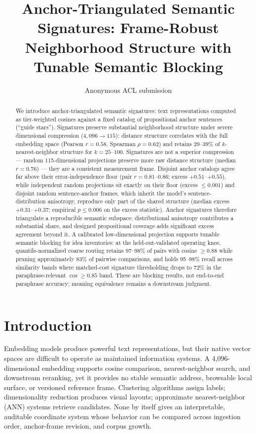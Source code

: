 \documentclass[11pt]{article}
\title{Anchor-Triangulated Semantic Signatures: Frame-Robust Neighborhood Structure with Tunable Semantic Blocking}
\author{Anonymous ACL submission}
\begin{document}
\maketitle

\begin{abstract}
We introduce anchor-triangulated semantic signatures: text representations computed as tier-weighted cosines against a fixed catalog of propositional anchor sentences (``guide stars''). Signatures preserve substantial neighborhood structure under severe dimensional compression ($4{,}096\rightarrow115$): distance structure correlates with the full embedding space (Pearson $r=0.58$, Spearman $\rho=0.62$) and retains 29--39\% of $k$-nearest-neighbor structure for $k=25$--100. Signatures are not a superior compression --- random 115-dimensional projections preserve more raw distance structure (median $r=0.76$) --- they are a consistent measurement frame. Disjoint anchor catalogs agree far above their error-independence floor (pair $r=0.81$--$0.86$; excess $+0.51$--$+0.55$), while independent random projections sit exactly on their floor (excess $\leq0.001$) and disjoint random sentence-anchor frames, which inherit the model's sentence-distribution anisotropy, reproduce only part of the shared structure (median excess $+0.31$--$+0.37$; empirical $p\leq0.006$ on the excess statistic). Anchor signatures therefore triangulate a reproducible semantic subspace: distributional anisotropy contributes a substantial share, and designed propositional coverage adds significant excess agreement beyond it. A calibrated low-dimensional projection supports tunable semantic blocking for idea inventories: at the held-out-validated operating knee, quantile-normalized coarse routing retains 97--98\% of pairs with cosine $\geq0.88$ while pruning approximately 83\% of pairwise comparisons, and holds 95--98\% recall across similarity bands where matched-cost signature thresholding drops to 72\% in the paraphrase-relevant $\cos\geq0.85$ band. These are blocking results, not end-to-end paraphrase accuracy; meaning equivalence remains a downstream judgment.
\end{abstract}

\section{Introduction}

Embedding models produce powerful text representations, but their native vector spaces are difficult to operate as maintained information systems. A 4,096-dimensional embedding supports cosine comparison, nearest-neighbor search, and downstream reranking, yet it provides no stable semantic address, browsable local surface, or versioned reference frame. Clustering algorithms assign labels; dimensionality reduction produces visual layouts; approximate nearest-neighbor (ANN) systems retrieve candidates. None by itself gives an interpretable, auditable coordinate system whose behavior can be compared across ingestion order, anchor-frame revision, and corpus growth.
\end{document}
